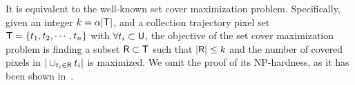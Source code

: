 It is equivalent to the well-known set cover maximization problem.
Specifically, given an integer $k = \alpha |\mathsf{T}|$, and a collection trajectory pixel set $\mathsf{T} = \{t_1, t_2, \cdots, t_n \}$ with $\forall t_i \subset \mathsf{U}$,
the objective of the set cover maximization problem is finding a subset $\mathsf{R} \subset \mathsf{T}$ such that $|\mathsf{R}| \leq k$ and the number of covered pixels in $|\cup_{t_i \in \mathsf{R}} t_i|$ is maximized.
We omit the proof of its NP-hardness, as it has been shown in~\cite{setcover}.





